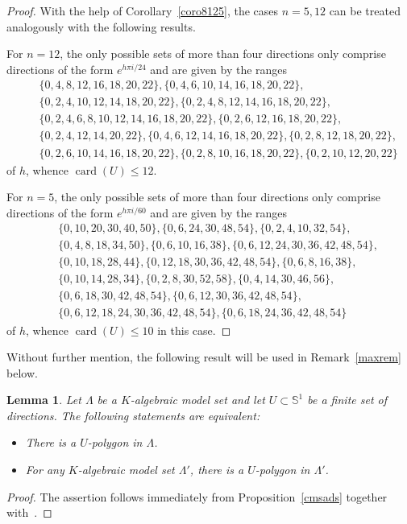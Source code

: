\documentclass[a4paper]{amsart}
\newtheorem{lem}[theorem]{Lemma}
\theoremstyle{definition}
\numberwithin{equation}{section}
\numberwithin{theorem}{section}
\begin{document}
\begin{proof}
With the help of
Corollary~\ref{coro8125},
the cases $n=5,12$ can be treated analogously with the following
results. 

For $n=12$, the only possible sets of more than four directions only comprise
directions of the form $e^{h\pi i/24}$ and are given by the ranges 
\begin{eqnarray*}&&\{0,4,8,12,16,18,20,22\},  \{0,4,6,10,14,16,18,20,22\},\\&& \{0,2,4,10,12,14,18,20,22\},
 \{0,2,4,8,12,14,16,18,20,22\},\\&& \{0,2,4,6,8,10,12,14,16,18,20,22\},
  \{0,2,6,12,16,18,20,22\},\\&& \{0,2,4,12,14,20,22\},  \{0,4,6,12,14,16,18,20,22\},
\{0,2,8,12,18,20,22\},\\&&   \{0,2,6,10,14,16,18,20,22\},\{0,2,8,10,16,18,20,22\},
\{0,2,10,12,20,22\}
\end{eqnarray*} 
of $h$, whence $\operatorname{card}(U)\leq 12$. 

For $n=5$, the only possible sets of more than four directions only comprise
directions of the form $e^{h\pi i/60}$ and are given by the ranges 
\begin{eqnarray*}&&
\{0,10,20,30,40,50\},\{0,6,24,30,48,54\},
\{0,2,4,10,32,54\},\\&& \{0,4,8,18,34,50\},
\{0,6,10,16,38\},\{0,6,12,24,30,36,42,48,54\},\\&& \{0,10,18,28,44\},
\{0,12,18,30,36,42,48,54\},\{0,6,8,16,38\},\\&& \{0,10,14,28,34\},\{0,2,8,30,52,58\},
\{0,4,14,30,46,56\},\\&& \{0,6,18,30,42,48,54\},\{0,6,12,30,36,42,48,54\},\\&& 
\{0,6,12,18,24,30,36,42,48,54\}, \{0,6,18,24,36,42,48,54\}
\end{eqnarray*}
of $h$, whence $\operatorname{card}(U)\leq 10$ in this case. 
\end{proof}

Without further mention, the following result will be used in Remark~\ref{maxrem} below.

\begin{lem}\label{upollem}
Let $\varLambda$ be a $K$-algebraic model set and let
$U\subset\mathbb{S}^1$ be a finite set of directions. The following
statements are equivalent:
\begin{itemize}
\item[(i)]
There is a $U$-polygon in $\varLambda$.
\item[(ii)]
For any $K$-algebraic model set $\varLambda'$, there is a $U$-polygon
in $\varLambda'$. 
\end{itemize}
\end{lem}
\begin{proof}
The assertion follows immediately from Proposition~\ref{cmsads} together with~\cite[Fact 4.4]{H5}. 
\end{proof}
\end{document}
